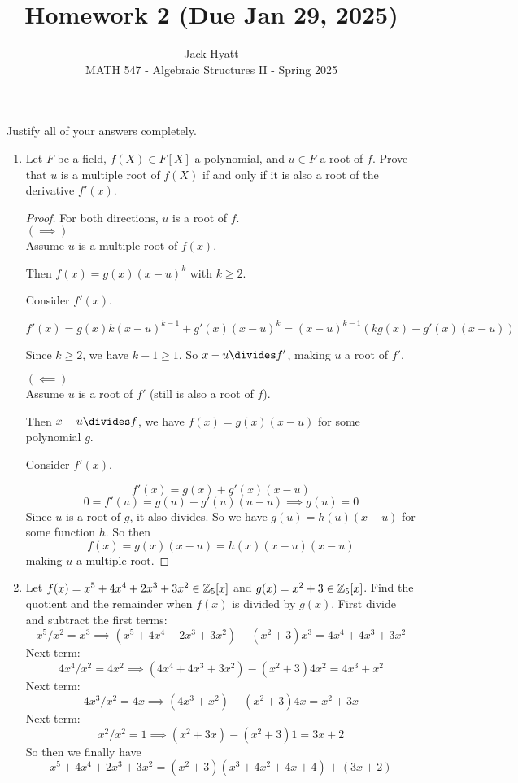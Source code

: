 \documentclass[12pt]{article}
\begin{document}
	
	
	
	\title{Homework 2 (Due Jan 29, 2025)}
	\author{Jack Hyatt\\ %
		MATH 547 - Algebraic Structures II - Spring 2025} 
	
	\maketitle
	
	Justify all of your answers completely.\\
	
	
	\medskip 
	
	\begin{enumerate}
		\item Let $F$ be a field, $f(X) \in F[X]$ a polynomial, and $u \in F$ a root of $f$. Prove that $u$ is a multiple root of $f(X)$ if and only if it is also a root of the derivative $f'(x)$.
		\begin{proof}
			For both directions, $u$ is a root of $f$.\\
			$(\implies)$\\
			Assume $u$ is a multiple root of $f(x)$.
			
			Then $f(x) = g(x)(x-u)^k$ with $k\geq2$.
			
			Consider $f'(x)$.
			
			\[f'(x) = g(x)k(x-u)^{k-1} + g'(x)(x-u)^k = (x-u)^{k-1} (kg(x)+g'(x)(x-u))\]
			
			Since $k \geq 2$, we have $k-1\geq1$. So $x-u \divides f'$, making $u$ a root of $f'$.
			
			$(\impliedby)$\\
			Assume $u$ is a root of $f'$ (still is also a root of $f$).
			
			Then $x-u \divides f$, we have $f(x) = g(x)(x-u)$ for some polynomial $g$.
			
			Consider $f'(x)$.
			
			\[f'(x) = g(x) + g'(x)(x-u)\]
			\[0 = f'(u) = g(u) + g'(u)(u-u) \implies g(u) = 0\]
			Since $u$ is a root of $g$, it also divides. So we have $g(u) = h(u)(x-u)$ for some function $h$. So then 
			\[f(x) = g(x)(x-u) = h(x)(x-u)(x-u)\]
			making $u$ a multiple root.
		\end{proof}
		
		\item Let $f(x) = x^5 + 4x^4 + 2x^3 + 3x^2 \in \mathbb{Z}_5[x]$ and $g(x) = x^2 + 3 \in \mathbb{Z}_5[x]$. Find the quotient and the remainder when $f(x)$ is divided by $g(x)$.\m
		First divide and subtract the first terms:
		\[x^5/x^2 = x^3 \implies (x^5 + 4x^4 + 2x^3 + 3x^2) - (x^2 + 3)x^3 = 4x^4 + 4x^3 + 3x^2\]
		Next term:
		\[4x^4/x^2 = 4x^2 \implies (4x^4 + 4x^3 + 3x^2) - (x^2 + 3)4x^2 = 4x^3 + x^2\]
		Next term:
		\[4x^3/x^2 = 4x \implies (4x^3 + x^2) - (x^2 + 3)4x = x^2 + 3x\]
		Next term:
		\[x^2/x^2 = 1 \implies (x^2 + 3x) - (x^2 + 3)1 = 3x + 2\]
		So then we finally have 
		\[x^5 + 4x^4 + 2x^3 + 3x^2 = (x^2 + 3)(x^3 + 4x^2 + 4x + 4) + (3x+2)\]
		

\end{enumerate}
\end{document}
